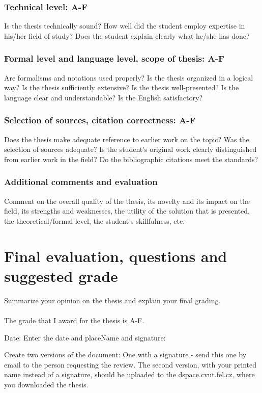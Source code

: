 \documentclass{article}
\begin{document}
\subsubsection*{Technical level: A-F} %
Is the thesis technically sound? How well did the student employ expertise in his/her field of study? Does the student explain clearly what he/she has done?

\subsubsection*{Formal level and language level, scope of thesis: A-F} %
Are formalisms and notations used properly? Is the thesis organized in a logical way? Is the thesis sufficiently extensive? Is the thesis well-presented? Is the language clear and understandable? Is the English satisfactory?

\subsubsection*{Selection of sources, citation correctness: A-F} %
Does the thesis make adequate reference to earlier work on the topic? Was the selection of sources adequate? Is the student’s original work clearly distinguished from earlier work in the field? Do the bibliographic citations meet the standards?

\subsubsection*{Additional comments and evaluation} %
Comment on the overall quality of the thesis, its novelty and its impact on the field, its strengths and weaknesses, the utility of the solution that is presented, the theoretical/formal level, the student’s skillfulness, etc.

\section{Final evaluation, questions and suggested grade}
Summarize your opinion on the thesis and explain your final grading.\\
\\\vspace{5mm}
The grade that I award for the thesis is A-F. %
\vspace{5mm}

Date: Enter the date and place\hfill                       Name and signature:\hspace{2cm}
\vspace{5mm}

Create two versions of the document: One with a signature - send this one by email to the person requesting the review. The second version, with your printed name instead of a signature, should be uploaded to the dspace.cvut.fel.cz, where you downloaded the thesis.
\end{document}
